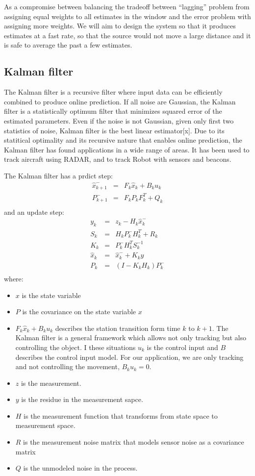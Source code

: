 As a compromise between balancing the tradeoff between ``lagging'' problem from assigning equal weights to all estimates in the window and the error problem with assigning more weights. We will aim to design the system so that it produces estimates at a fast rate, so that the source would not move a large distance and it is safe to average the past a few estimates.

\subsection{Kalman filter}
The Kalman filter is a recursive filter where input data can be efficiently combined to produce online prediction. If all noise are Gaussian, the Kalman filter is a statistically optimum filter that minimizes squared error of the estimated parameters. Even if the noise is not Gaussian, given only first two statistics of noise, Kalman filter is the best linear estimator[x]. Due to its statitical optimality and its recursive nature that enables online prediction, the Kalman filter has found applications in a wide range of areas. It has been used to track aircraft using RADAR, and to track Robot with sensors and beacons.

The Kalman filter has a prdict step:
\begin{eqnarray}
\hat{x}_{k+1}^- & = &F_k \hat{x}_k + B_ku_k\\
P_{k+1}^- & = & F_kP_kF_k^T + Q_k\\
\end{eqnarray}
and an update step:
\begin{eqnarray}
y_k & = & z_k - H_k\hat{x}_k^-\\
S_k & = & H_kP_k^-H_k^T + R_k \\
K_k & = & P_k^-H_k^TS_k^{-1}\\
\hat{x}_k & = & \hat{x}_k^- + K_ky\\
P_k & = & (I-K_kH_k)P_k^-\\
\end{eqnarray}
where:
\begin{itemize}
\item $x$ is the state variable
\item $P$ is the covariance on the state variable $x$
\item $F_k \hat{x}_k + B_k u_k$ describes the station transition form time $k$ to $k+1$. The Kalman filter is a general framework which allows not only tracking but also controlling the object. I these situations $u_k$ is the control input and $B$ describes the control input model. For our application, we are only tracking and not controlling the movement, $B_ku_k = 0$.
\item $z$ is the measurement.
\item $y$ is the residue in the measurement sapce. 
\item $H$ is the measurement function that transforms from state space to measurement space.
\item $R$ is the measurement noise matrix that models sensor noise as a covariance matrix
\item $Q$ is the unmodeled noise in the process.
\end{itemize}
